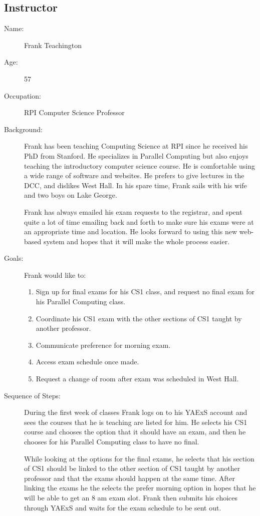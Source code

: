\documentclass[11pt]{article}
\begin{document}
\subsection{Instructor} %
\begin{description}
\item[Name:] Frank Teachington
\item[Age:] 57
\item[Occupation:] RPI Computer Science Professor
\item[Background:] Frank has been teaching Computing Science at RPI since he received his PhD from Stanford. He specializes in Parallel Computing but also enjoys teaching the introductory computer science course. He is comfortable using a wide range of software and websites. He prefers to give lectures in the DCC, and dislikes West Hall.  In his spare time, Frank sails with his wife and two boys on Lake George.

Frank has always emailed his exam requests to the registrar, and spent quite a lot of time emailing back and forth to make sure his exams were at an appropriate time and location. He looks forward to using this new web-based system and hopes that it will make the whole process easier.

\item[Goals:]
Frank would like to:
\begin{enumerate}
\item Sign up for final exams for his CS1 class, and request no final exam for his Parallel Computing class.
\item Coordinate his CS1 exam with the other sections of CS1 taught by another professor.
\item Communicate preference for morning exam.
\item Access exam schedule once made.
\item Request a change of room after exam was scheduled in West Hall.
\end{enumerate}

\item[Sequence of Steps:]
During the first week of classes Frank logs on to his YAExS account and sees the courses that he is teaching are listed for him. He selects his CS1 course and chooses the option that it should have an exam, and then he chooses for his Parallel Computing class to have no final. 

While looking at the options for the final exams, he selects that his section of CS1 should be linked to the other section of CS1 taught by another professor and that the exams should happen at the same time. After linking the exams he the selects the prefer morning option in hopes that he will be able to get an 8 am exam slot. Frank then submits his choices through YAExS and waits for the exam schedule to be sent out. 


\end{description}
\end{document}
